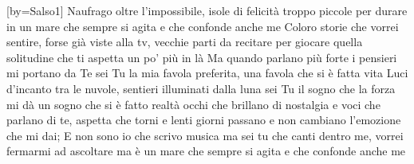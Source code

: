 [by={Salso1}]
\beginverse
Naufrago oltre l'impossibile,
isole di felicità
troppo piccole per durare
in un mare che sempre si agita
e che confonde anche me
Coloro storie che vorrei sentire,
forse già viste alla tv,
vecchie parti da recitare
per giocare quella solitudine
che ti aspetta un po' più in là
\endverse
\beginchorus
Ma quando parlano più forte
i pensieri mi portano da Te
sei Tu la mia favola preferita,
una favola che si è fatta vita
\endchorus
\beginverse
Luci d'incanto tra le nuvole,
sentieri illuminati dalla luna
sei Tu il sogno che la forza mi dà
un sogno che si è fatto realtà
occhi che brillano di nostalgia
e voci che parlano di te,
aspetta che torni e lenti giorni passano
e non cambiano l'emozione che mi dai;
E non sono io che scrivo musica
ma sei tu che canti dentro me,
vorrei fermarmi ad ascoltare
ma è un mare che sempre si agita
e che confonde anche me
\endverse
\endsong
